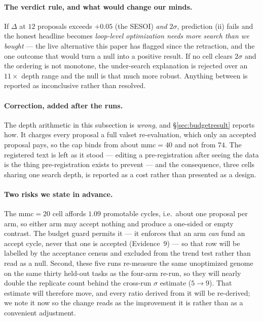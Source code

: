 \documentclass[11pt]{article}
\newcommand{\dd}{\ensuremath{\Delta}}
\begin{document}
\paragraph{The verdict rule, and what would change our minds.} If $\dd$ at $12$ proposals exceeds
$+0.05$ (the SESOI) \emph{and} $2\sigma$, prediction (ii) fails and the honest headline becomes
\emph{loop-level optimization needs more search than we bought} --- the live alternative this
paper has flagged since the retraction, and the one outcome that would turn a null into a
positive result. If no cell clears $2\sigma$ and the ordering is not monotone, the under-search
explanation is rejected over an $11\times$ depth range and the null is that much more robust.
Anything between is reported as inconclusive rather than resolved.

\paragraph{Correction, added after the runs.} The depth arithmetic in this subsection is
\emph{wrong}, and \S\ref{sec:budgetresult} reports how. It charges every proposal a full valset
re-evaluation, which only an accepted proposal pays, so the cap binds from about
$\mathrm{mmc}=40$ and not from $74$. The registered text is left as it stood --- editing a
pre-registration after seeing the data is the thing pre-registration exists to prevent --- and the
consequence, three cells sharing one search depth, is reported as a cost rather than presented as
a design.

\paragraph{Two risks we state in advance.} The $\mathrm{mmc}{=}20$ cell affords $1.09$ promotable
cycles, i.e.\ about one proposal per arm, so either arm may accept nothing and produce a
one-sided or empty contrast. The budget guard permits it --- it enforces that an arm \emph{can}
fund an accept cycle, never that one is accepted (Evidence~9) --- so that row will be labelled by
the acceptance census and excluded from the trend test rather than read as a null. Second, these
five runs re-measure the same unoptimized genome on the same thirty held-out tasks as the four-arm
re-run, so they will nearly double the replicate count behind the cross-run $\sigma$ estimate
($5 \to 9$). That estimate will therefore move, and every ratio derived from it will be
re-derived; we note it now so the change reads as the improvement it is rather than as a
convenient adjustment.
\end{document}
